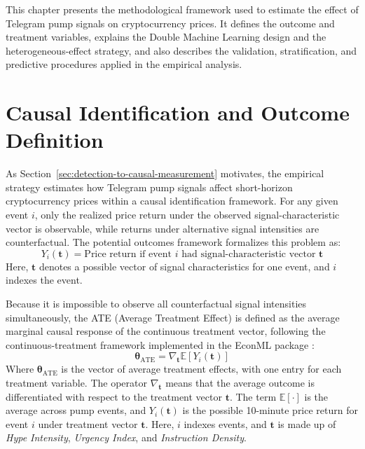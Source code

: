 This chapter presents the methodological framework used to estimate the effect of Telegram pump signals on cryptocurrency prices. It defines the outcome and treatment variables, explains the Double Machine Learning design and the heterogeneous-effect strategy, and also describes the validation, stratification, and predictive procedures applied in the empirical analysis.

\label{ch:methodology}
\section{Causal Identification and Outcome Definition}
\label{sec:theory-framework}
\label{sec:outcome-variable}

As Section~\ref{sec:detection-to-causal-measurement} motivates, the empirical strategy estimates how Telegram pump signals affect short-horizon cryptocurrency prices within a causal identification framework. For any given event $i$, only the realized price return under the observed signal-characteristic vector is observable, while returns under alternative signal intensities are counterfactual. The potential outcomes framework \cite{rubin1974estimating} formalizes this problem as:
\begin{equation}
Y_i(\mathbf{t}) = \text{Price return if event } i \text{ had signal-characteristic vector } \mathbf{t}
\end{equation}
Here, $\mathbf{t}$ denotes a possible vector of signal characteristics for one event, and $i$ indexes the event.

Because it is impossible to observe all counterfactual signal intensities simultaneously, the ATE (Average Treatment Effect) is defined as the average marginal causal response of the continuous treatment vector, following the continuous-treatment framework implemented in the EconML package \cite{econml}:
\begin{equation}
\boldsymbol{\theta}_{\mathrm{ATE}} = \nabla_{\mathbf{t}}\mathbb{E}[Y_i(\mathbf{t})]
\label{eq:ate}
\end{equation}
Where $\boldsymbol{\theta}_{\mathrm{ATE}}$ is the vector of average treatment effects, with one entry for each treatment variable. The operator $\nabla_{\mathbf{t}}$ means that the average outcome is differentiated with respect to the treatment vector $\mathbf{t}$. The term $\mathbb{E}[\cdot]$ is the average across pump events, and $Y_i(\mathbf{t})$ is the possible 10-minute price return for event $i$ under treatment vector $\mathbf{t}$. Here, $i$ indexes events, and $\mathbf{t}$ is made up of \textit{Hype Intensity}, \textit{Urgency Index}, and \textit{Instruction Density}.

